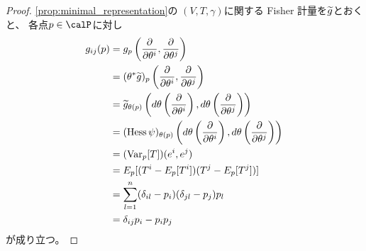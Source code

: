 \documentclass[report]{jlreq}
\begin{document}

\begin{proof}
    \cref{prop:minimal_representation}の
    $(V, T, \gamma)$に関する Fisher 計量を$\widetilde{g}$とおくと、
    各点$p \in \calP$に対し
    \begin{alignat}{1}
        g_{ij}(p)
            &=
                g_p \myparen{
                    \deldel{\theta^i},
                    \deldel{\theta^j}
                }
                \\
            &=
                (\theta^* \wt{g})_{p} \myparen{
                    \deldel{\theta^i},
                    \deldel{\theta^j}
                }
                \\
            &=
                \wt{g}_{\theta(p)} \myparen{
                    d\theta \myparen{
                        \deldel{\theta^i}
                    },
                    d\theta \myparen{
                        \deldel{\theta^j}
                    }
                }
                \\
            &=
                (\Hess \psi)_{\theta(p)} \myparen{
                    d\theta \myparen{
                        \deldel{\theta^i}
                    },
                    d\theta \myparen{
                        \deldel{\theta^j}
                    }
                }
                \\
            &=
                (\Var_p [T])(e^i, e^j)
                \\
            &=
                E_p[(T^i - E_p[T^i])(T^j - E_p[T^j])]
                \\
            &=
                \sum_{l = 1}^n
                    (\delta_{il} - p_i)
                    (\delta_{jl} - p_j)
                    p_l
                \\
            &=
                \delta_{ij} p_i - p_i p_j
    \end{alignat}
    が成り立つ。
\end{proof}
\end{document}
